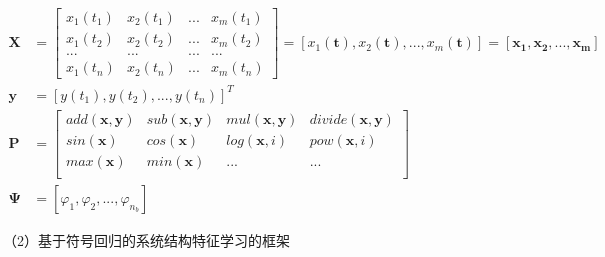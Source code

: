 \begin{subequations}
\begin{align}
\mathbf{X} &= \begin{bmatrix}
x_{1}(t_{1}) & x_{2}(t_{1}) & ... & x_{m}(t_{1}) \\ 
x_{1}(t_{2}) & x_{2}(t_{2})  & ...  & x_{m}(t_{2}) \\ 
... & ... & ...  & ... \\ 
x_{1}(t_{n}) & x_{2}(t_{n})  & ...  & x_{m}(t_{n}) 
\end{bmatrix} = [x_{1}(\mathbf{t}), x_{2}(\mathbf{t}), ..., x_{m}(\mathbf{t})] = [\mathbf{x_{1}}, \mathbf{x_{2}}, ..., \mathbf{x_{m}}] \label{equ:sr-object-func-x} \\
\mathbf{y} &= [y(t_{1}), y(t_{2}), ..., y(t_{n})]^{T} \label{equ:sr-object-func-y}\\
\mathbf{P} &= \begin{bmatrix}
add(\mathbf{x,y}) & sub(\mathbf{x,y}) & mul(\mathbf{x,y}) & divide(\mathbf{x,y}) \\ 
sin(\mathbf{x}) & cos(\mathbf{x}) & log(\mathbf{x}, i) & pow(\mathbf{x}, i) \\ 
max(\mathbf{x})& min(\mathbf{x}) & ... & ...  \\ 
\end{bmatrix} \label{equ:sr-ops} \\
\mathbf{\Psi} &= [\varphi_{1}, \varphi_{2}, ..., \varphi_{n_{b}}] \label{equ:sr-basefunc} 
\end{align}
\end{subequations}

（2）基于符号回归的系统结构特征学习的框架

